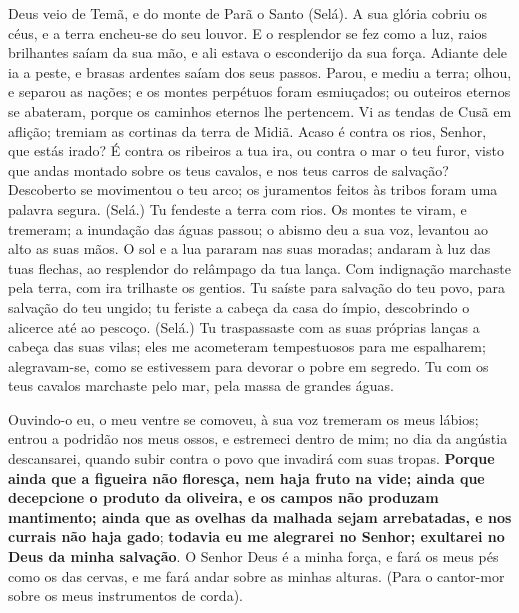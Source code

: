 Deus veio de Temã, e do monte de Parã o Santo (Selá). A sua glória
cobriu os céus, e a terra encheu-se do seu louvor. E o
resplendor se fez como a luz, raios brilhantes saíam da sua mão, e
ali estava o esconderijo da sua força. Adiante dele ia a peste,
e brasas ardentes saíam dos seus passos. Parou, e mediu a terra;
olhou, e separou as nações; e os montes perpétuos foram esmiuçados;
ou outeiros eternos se abateram, porque os caminhos eternos lhe
pertencem. Vi as tendas de Cusã em aflição; tremiam as cortinas
da terra de Midiã. Acaso é contra os rios, Senhor, que estás
irado? É contra os ribeiros a tua ira, ou contra o mar o teu furor,
visto que andas montado sobre os teus cavalos, e nos teus carros de
salvação? Descoberto se movimentou o teu arco; os juramentos
feitos às tribos foram uma palavra segura. (Selá.) Tu fendeste a
terra com rios. Os montes te viram, e tremeram; a inundação
das águas passou; o abismo deu a sua voz, levantou ao alto as suas
mãos. O sol e a lua pararam nas suas moradas; andaram à luz
das tuas flechas, ao resplendor do relâmpago da tua lança.
Com indignação marchaste pela terra, com ira trilhaste os
gentios. Tu saíste para salvação do teu povo, para salvação
do teu ungido; tu feriste a cabeça da casa do ímpio, descobrindo o
alicerce até ao pescoço. (Selá.) Tu traspassaste com as suas
próprias lanças a cabeça das suas vilas; eles me acometeram
tempestuosos para me espalharem; alegravam-se, como se estivessem
para devorar o pobre em segredo. Tu com os teus cavalos
marchaste pelo mar, pela massa de grandes águas.

Ouvindo-o eu, o meu ventre se comoveu, à sua voz tremeram os meus
lábios; entrou a podridão nos meus ossos, e estremeci dentro de mim;
no dia da angústia descansarei, quando subir contra o povo que
invadirá com suas tropas. \textbf{Porque ainda que a figueira
não floresça, nem haja fruto na vide; ainda que decepcione o produto
da oliveira, e os campos não produzam mantimento; ainda que as
ovelhas da malhada sejam arrebatadas, e nos currais não haja gado};
\textbf{todavia eu me alegrarei no Senhor; exultarei no Deus
da minha salvação}. O Senhor Deus é a minha força, e fará os
meus pés como os das cervas, e me fará andar sobre as minhas
alturas. (Para o cantor-mor sobre os meus instrumentos de corda).

